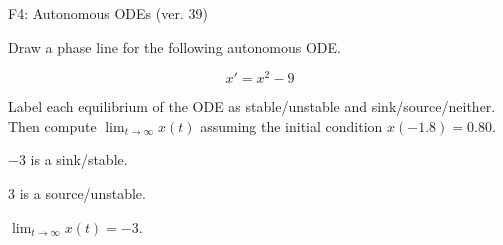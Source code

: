 \begin{exercise}
  \begin{exerciseTitle}F4: Autonomous ODEs (ver. 39)\end{exerciseTitle}
  \begin{exerciseStatement}
    

      Draw a phase line for the following 
      autonomous ODE.
    

    
\[x'= x^{2} - 9\]

    

      Label each equilibrium of the ODE
      as stable/unstable and sink/source/neither.
      Then compute \(\lim_{t\to\infty}x(t)\)
      assuming the initial condition
      \(x( -1.8 )= 0.80\).
    

  \end{exerciseStatement}
  \begin{exerciseAnswer}
    

      \(-3\) is a sink/stable.
      
      \(3\) is a source/unstable.
    

    

      \(\lim_{t\to\infty}x(t)=-3\).
    

  \end{exerciseAnswer}
\end{exercise}